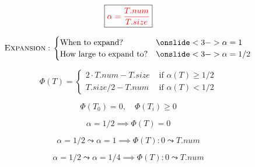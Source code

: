 \begin{frame}{}
  \centerline{}

  \[
    \boxed{\textcolor{red}{\alpha = \frac{T.num}{T.size}}}
  \]

  \pause
  \vspace{0.30cm}
  \[
    \textsc{Expansion}: \left.
    \begin{cases}
      \text{When to expand?}		& \onslide<3->{\alpha = 1} \\
      \text{How large to expand to?} 	& \onslide<3->{\alpha = 1/2}
    \end{cases}
    \right.
  \]


\end{frame}

\begin{frame}{}
  \[
    \Phi(T) = \left.
    \begin{cases}
      2 \cdot T.num - T.size & \text{ if } \alpha(T) \ge 1/2	\\
      T.size/2 - T.num	     & \text{ if } \alpha(T) < 1/2
    \end{cases} \right.
  \]

  \pause
  \[
    \Phi(T_0) = 0,\quad \Phi(T_{i}) \ge 0
  \]

  \pause
  \vspace{0.30cm}
  \[
    \alpha = 1/2 \implies \Phi(T) = 0
  \]

  \vspace{0.30cm}
  \pause
  \[
    \alpha = 1/2 \leadsto \alpha = 1 \implies \Phi(T): 0 \leadsto T.num
  \]

  \pause
  \[
    \alpha = 1/2 \leadsto \alpha = 1/4 \implies \Phi(T): 0 \leadsto T.num
  \]
\end{frame}

